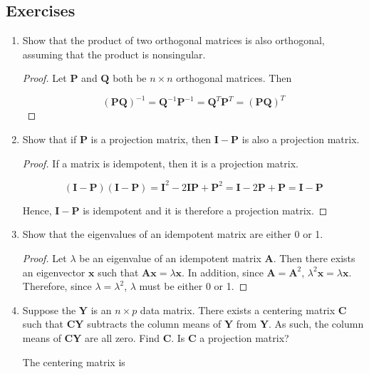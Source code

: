 \documentclass[11pt]{article}
\theoremstyle{definition}
\begin{document}
\subsection{Exercises}
\begin{enumerate}
\item Show that the product of two orthogonal matrices is also orthogonal, assuming that the product is nonsingular.
\begin{proof}
Let $\mathbf{P}$ and $\mathbf{Q}$ both be $n \times n$ orthogonal matrices.  Then

 $$(\mathbf{PQ})^{-1} = \mathbf{Q}^{-1}\mathbf{P}^{-1} = \mathbf{Q}^T \mathbf{P}^T = (\mathbf{PQ})^T$$
 
 \end{proof}

\item Show that if $\mathbf{P}$ is a projection matrix, then $\mathbf{I} - \mathbf{P}$ is also a projection matrix.

\begin{proof}
If a matrix is idempotent, then it is a projection matrix.

$$(\mathbf{I} - \mathbf{P})(\mathbf{I} - \mathbf{P}) = \mathbf{I}^2 - 2\mathbf{IP} + \mathbf{P}^2 = \mathbf{I} - 2\mathbf{P} + \mathbf{P} = \mathbf{I} - \mathbf{P}$$

Hence, $\mathbf{I} - \mathbf{P}$ is idempotent and it is therefore a projection matrix.
\end{proof}

\item Show that the eigenvalues of an idempotent matrix are either 0 or 1.
\begin{proof}
Let $\lambda$ be an eigenvalue of an idempotent matrix $\mathbf{A}$.  Then there exists an eigenvector $\mathbf{x}$ such that $\mathbf{Ax} = \lambda \mathbf{x}$.  In addition, since $\mathbf{A} = \mathbf{A}^2$, $\lambda^2 \mathbf{x} = \lambda \mathbf{x}$.  Therefore, since $\lambda = \lambda^2$, $\lambda$ must be either 0 or 1.
\end{proof}

\item Suppose the $\mathbf{Y}$ is an $n \times p$ data matrix.  There exists a centering matrix $\mathbf{C}$ such that $\mathbf{CY}$ subtracts the column means of $\mathbf{Y}$ from $\mathbf{Y}$.  As such, the column means of $\mathbf{CY}$ are all zero.  Find $\mathbf{C}$.  Is $\mathbf{C}$ a projection matrix?

The centering matrix is 


\end{enumerate}
\end{document}
